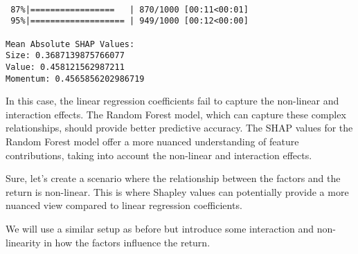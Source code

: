 \documentclass[
  letterpaper,
  DIV=11,
  numbers=noendperiod]{scrartcl}
\begin{document}
\begin{verbatim}

 87%|=================   | 870/1000 [00:11<00:01]       
 95%|=================== | 949/1000 [00:12<00:00]       

Mean Absolute SHAP Values:
Size: 0.3687139875766077
Value: 0.458121562987211
Momentum: 0.4565856202986719
\end{verbatim}

In this case, the linear regression coefficients fail to capture the
non-linear and interaction effects. The Random Forest model, which can
capture these complex relationships, should provide better predictive
accuracy. The SHAP values for the Random Forest model offer a more
nuanced understanding of feature contributions, taking into account the
non-linear and interaction effects.

Sure, let's create a scenario where the relationship between the factors
and the return is non-linear. This is where Shapley values can
potentially provide a more nuanced view compared to linear regression
coefficients.

We will use a similar setup as before but introduce some interaction and
non-linearity in how the factors influence the return.
\end{document}
